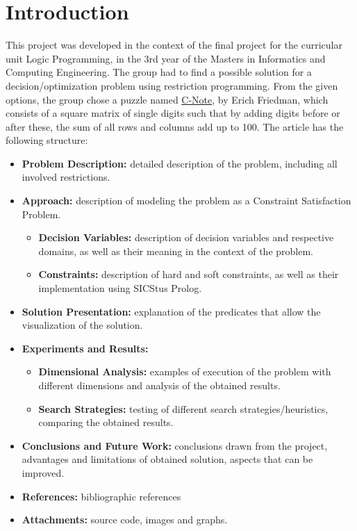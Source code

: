 \documentclass[runningheads]{llncs}
\begin{document}
\section{Introduction}
This project was developed in the context of the final project for the curricular unit Logic Programming, in the 3rd year of the Masters in Informatics and Computing Engineering. The group had to find a possible solution for a decision/optimization problem using restriction programming. From the given options, the group chose a puzzle named \href{https://erich-friedman.github.io/puzzle/100/}{C-Note}, by Erich Friedman, which consists of a square matrix of single digits such that by adding digits before or after these, the sum of all rows and columns add up to 100.
The article has the following structure:
\begin{itemize}
    \item \textbf{Problem Description:} detailed description of the problem, including all involved restrictions.
    \item \textbf{Approach:} description of modeling the problem as a Constraint Satisfaction Problem.
    \begin{itemize}
        \item \textbf{Decision Variables:} description of decision variables and respective domains, as well as their meaning in the context of the problem.
        \item \textbf{Constraints:} description of hard and soft constraints, as well as their implementation using SICStus Prolog.
    \end{itemize}
    \item \textbf{Solution Presentation:} explanation of the predicates that allow the visualization of the solution.
    \item \textbf{Experiments and Results:}
    \begin{itemize}
        \item \textbf{Dimensional Analysis:} examples of execution of the problem with different dimensions and analysis of the obtained results.
        \item \textbf{Search Strategies:} testing of different search strategies/heuristics, comparing the obtained results. 
    \end{itemize}
    \item \textbf{Conclusions and Future Work:} conclusions drawn from the project, advantages and limitations of obtained solution, aspects that can be improved.
    \item \textbf{References:} bibliographic references
    \item \textbf{Attachments: } source code, images and graphs.
\end{itemize}
\end{document}
